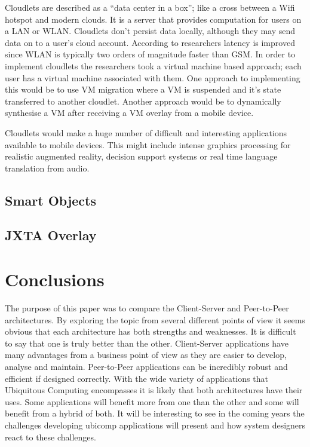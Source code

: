 \documentclass[11pt]{amsart}
\begin{document}
Cloudlets are described as a ``data center in a box''; like a cross between a Wifi hotspot and modern clouds. It is a server that provides computation for users on a LAN or WLAN. Cloudlets don't persist data locally, although they may send data on to a user's cloud account. According to researchers latency is improved since WLAN is typically two orders of magnitude faster than GSM. In order to implement cloudlets the researchers took a virtual machine based approach; each user has a virtual machine associated with them. One approach to implementing this would be to use VM migration where a VM is suspended and it's state transferred to another cloudlet. Another approach would be to dynamically synthesise a VM after receiving a VM overlay from a mobile device. 

Cloudlets would make a huge number of difficult and interesting applications available to mobile devices. This might include intense graphics processing for realistic augmented reality, decision support systems or real time language translation from audio.


\subsection{Smart Objects}

\subsection{JXTA Overlay}

\section{Conclusions}

The purpose of this paper was to compare the Client-Server and Peer-to-Peer architectures. By exploring the topic from several different points of view it seems obvious that each architecture has both strengths and weaknesses. It is difficult to say that one is truly better than the other. Client-Server applications have many advantages from a business point of view as they are easier to develop, analyse and maintain. Peer-to-Peer applications can be incredibly robust and efficient if designed correctly. With the wide variety of applications that Ubiquitous Computing encompasses it is likely that both architectures have their uses. Some applications will benefit more from one than the other and some will benefit from a hybrid of both. It will be interesting to see in the coming years the challenges developing ubicomp applications will present and how system designers react to these challenges.


\end{document}
